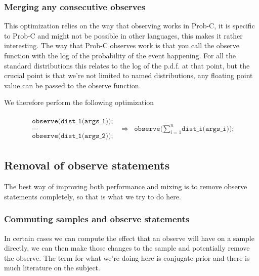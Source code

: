 \documentclass[a4paper]{article}
\newcommand{\optimization}[2]{
	\[
		\begin{array}{rcl}
			#1 & \Rightarrow & #2
		\end{array}
	\]
}
\begin{document}
\subsubsection{Merging any consecutive observes}

This optimization relies on the way that observing works in Prob-C, it is specific to Prob-C and might not be possible in other languages, this makes it rather interesting. The way that Prob-C observes work is that you call the observe function with the log of the probability of the event happening. For all the standard distributions this relates to the log of the p.d.f. at that point, but the crucial point is that we're not limited to named distributions, any floating point value can be passed to the observe function.

We therefore perform the following optimization
\optimization{
	\begin{array}{l}
		\texttt{observe(dist\_1(args\_1));} \\
		\texttt{...} \\
		\texttt{observe(dist\_1(args\_2));}
	\end{array}
}{
	\texttt{observe(}\sum_{i=1}^n\texttt{dist\_i(args\_i));}
}




\subsection{Removal of observe statements}

The best way of improving both performance and mixing is to remove observe statements completely, so that is what we try to do here.




\subsubsection{Commuting samples and observe statements}

In certain cases we can compute the effect that an observe will have on a sample directly, we can then make those changes to the sample and potentially remove the observe. The term for what we're doing here is conjugate prior and there is much literature on the subject.
\end{document}

